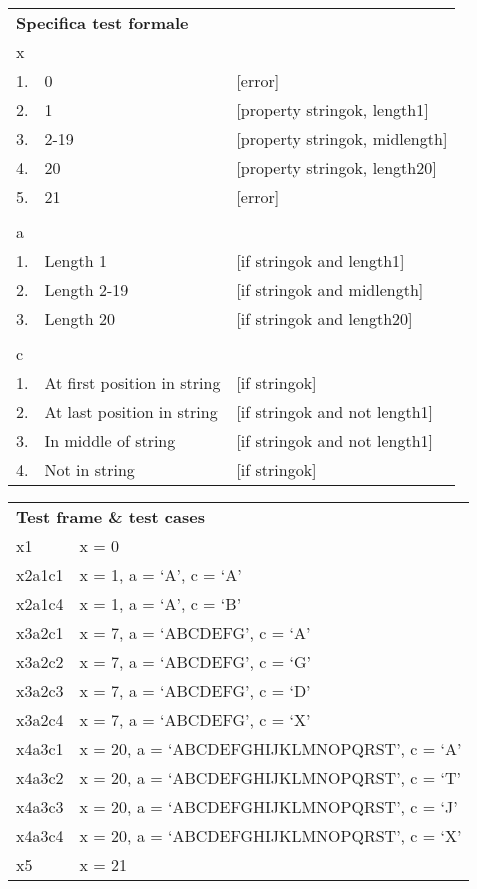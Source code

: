 \vspace{1cm}

\begin{tabular}{lll}
\multicolumn{3}{l}{ \textbf{Specifica test formale} }						\\
x		&								&									\\
1.		&	0							&	[error]							\\
2.		&	1							&	[property stringok, length1]	\\
3.		&	2-19						&	[property stringok, midlength]	\\
4.		&	20							&	[property stringok, length20]	\\
5.		&	21							&	[error]							\\
		&								&									\\
a		&								&									\\
1.		&	Length 1					&	[if stringok and length1]		\\
2.		&	Length 2-19 				&	[if stringok and midlength]		\\
3.		&	Length 20					&	[if stringok and length20]		\\
		&								&									\\
c		&								&									\\
1.		&	At first position in string	&	[if stringok]					\\
2.		&	At last position in string	&	[if stringok and not length1]	\\
3.		&	In middle of string			&	[if stringok and not length1]	\\
4.		&	Not in string				&	[if stringok]					\\
\end{tabular}


\vspace{1cm}

\begin{tabular}{ll}
\multicolumn{2}{l}{ \textbf{Test frame \& test cases} }		\\
x1		&	x = 0											\\
x2a1c1	&	x = 1, a = ‘A’, c = ‘A’							\\
x2a1c4	&	x = 1, a = ‘A’, c = ‘B’							\\
x3a2c1	&	x = 7, a = ‘ABCDEFG’, c = ‘A’					\\
x3a2c2	&	x = 7, a = ‘ABCDEFG’, c = ‘G’					\\
x3a2c3	&	x = 7, a = ‘ABCDEFG’, c = ‘D’					\\
x3a2c4	&	x = 7, a = ‘ABCDEFG’, c = ‘X’					\\
x4a3c1	&	x = 20, a = ‘ABCDEFGHIJKLMNOPQRST’, c = ‘A’		\\
x4a3c2	&	x = 20, a = ‘ABCDEFGHIJKLMNOPQRST’, c = ‘T’		\\
x4a3c3	&	x = 20, a = ‘ABCDEFGHIJKLMNOPQRST’, c = ‘J’		\\
x4a3c4	&	x = 20, a = ‘ABCDEFGHIJKLMNOPQRST’, c = ‘X’		\\
x5		&	x = 21											\\
\end{tabular}